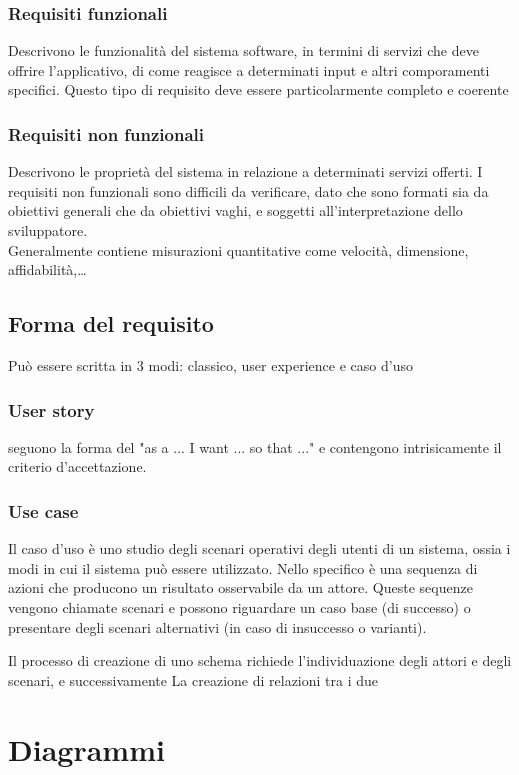 \documentclass[12pt, a4paper]{article}
\begin{document}
\subsubsection*{Requisiti funzionali}
Descrivono le funzionalità del sistema software, in termini di servizi che deve offrire l'applicativo, di come reagisce 
a determinati input e altri comporamenti specifici. Questo tipo di requisito deve essere particolarmente completo e
coerente

\subsubsection*{Requisiti non funzionali}
Descrivono le proprietà del sistema in relazione a determinati servizi offerti. I requisiti non funzionali sono difficili 
da verificare, dato che sono formati sia da obiettivi generali che da obiettivi vaghi, e soggetti all'interpretazione 
dello sviluppatore.\\Generalmente contiene misurazioni quantitative come velocità, dimensione, affidabilità,\dots

\subsection{Forma del requisito}
Può essere scritta in 3 modi: classico, user experience e caso d'uso
\subsubsection*{User story}
seguono la forma del "as a ... I want ... so that ..." e contengono intrisicamente il criterio d'accettazione.
\subsubsection*{Use case}
Il caso d'uso è uno studio degli scenari operativi degli utenti di un sistema, ossia i modi in cui il sistema può essere 
utilizzato. Nello specifico è una sequenza di azioni che producono un risultato osservabile da un attore. Queste 
sequenze vengono chiamate scenari e possono riguardare un caso base (di successo) o presentare degli scenari alternativi
(in caso di insuccesso o varianti). 

Il processo di creazione di uno schema richiede l'individuazione degli attori e degli scenari, e successivamente La
creazione di relazioni tra i due

\section{Diagrammi}
\end{document}
